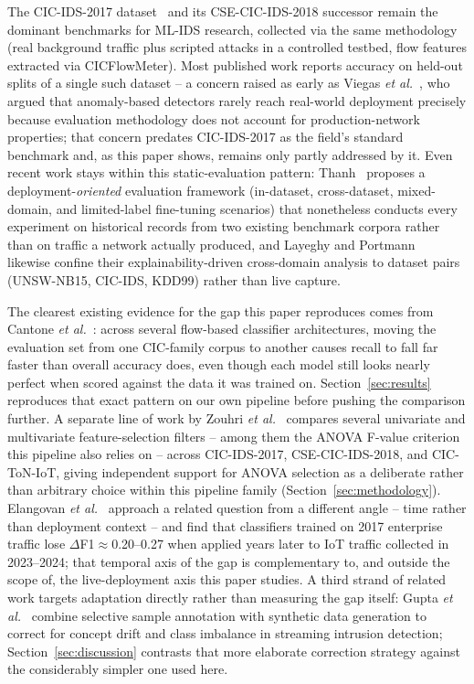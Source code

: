 \documentclass[conference]{IEEEtran}
\begin{document}
The CIC-IDS-2017 dataset~\cite{sharafaldin2018generating} and its
CSE-CIC-IDS-2018 successor remain the dominant benchmarks for ML-IDS
research, collected via the same methodology (real background traffic
plus scripted attacks in a controlled testbed, flow features extracted via
CICFlowMeter). Most published work reports accuracy on held-out splits of
a single such dataset -- a concern raised as early as
Viegas \textit{et al.}~\cite{viegas2017reliable}, who argued that
anomaly-based detectors rarely reach real-world deployment precisely
because evaluation methodology does not account for production-network
properties; that concern predates CIC-IDS-2017 as the field's standard
benchmark and, as this paper shows, remains only partly addressed by it.
Even recent work stays within this static-evaluation pattern:
Thanh~\cite{thanh2026tanids} proposes a deployment-\emph{oriented}
evaluation framework (in-dataset, cross-dataset, mixed-domain, and
limited-label fine-tuning scenarios) that nonetheless conducts every
experiment on historical records from two existing benchmark corpora
rather than on traffic a network actually produced, and
Layeghy and Portmann~\cite{layeghy2023explainable} likewise confine their
explainability-driven cross-domain analysis to dataset pairs (UNSW-NB15,
CIC-IDS, KDD99) rather than live capture.

The clearest existing evidence for the gap this paper reproduces comes
from Cantone \textit{et al.}~\cite{cantone2024crossdataset}: across
several flow-based classifier architectures, moving the evaluation set
from one CIC-family corpus to another causes recall to fall far faster
than overall accuracy does, even though each model still looks nearly
perfect when scored against the data it was trained on.
Section~\ref{sec:results} reproduces that exact pattern on our own
pipeline before pushing the comparison further. A separate line of work
by Zouhri \textit{et al.}~\cite{zouhri2024filter} compares several
univariate and multivariate feature-selection filters -- among them the
ANOVA F-value criterion this pipeline also relies on -- across
CIC-IDS-2017, CSE-CIC-IDS-2018, and CIC-ToN-IoT, giving independent
support for ANOVA selection as a deliberate rather than arbitrary choice
within this pipeline family (Section~\ref{sec:methodology}). Elangovan
\textit{et al.}~\cite{elangovan2026temporal} approach a related question
from a different angle -- time rather than deployment context -- and find
that classifiers trained on 2017 enterprise traffic lose
${\Delta}$F1${\approx}$0.20--0.27 when applied years later to IoT traffic
collected in 2023--2024; that temporal axis of the gap is complementary
to, and outside the scope of, the live-deployment axis this paper studies.
A third strand of related work targets adaptation directly rather than
measuring the gap itself: Gupta \textit{et al.}~\cite{gupta2025generative}
combine selective sample annotation with synthetic data generation to
correct for concept drift and class imbalance in streaming intrusion
detection; Section~\ref{sec:discussion} contrasts that more elaborate
correction strategy against the considerably simpler one used here.
\end{document}
